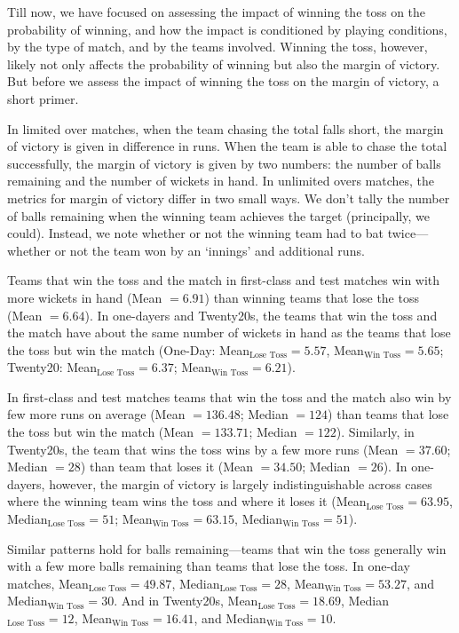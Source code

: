 \documentclass[12pt]{article}
\begin{document}
Till now, we have focused on assessing the impact of winning the toss on the probability of winning, and how the impact is conditioned by playing conditions, by the type of match, and by the teams involved. Winning the toss, however, likely not only affects the probability of winning but also the margin of victory. But before we assess the impact of winning the toss on the margin of victory, a short primer. 

In limited over matches, when the team chasing the total falls short, the margin of victory is given in difference in runs. When the team is able to chase the total successfully, the margin of victory is given by two numbers: the number of balls remaining and the number of wickets in hand. In unlimited overs matches, the metrics for margin of victory differ in two small ways. We don't tally the number of balls remaining when the winning team achieves the target (principally, we could). Instead, we note whether or not the winning team had to bat twice---whether or not the team won by an `innings' and additional runs.

Teams that win the toss and the match in first-class and test matches win with more wickets in hand (Mean $= 6.91$) than winning teams that lose the toss (Mean $= 6.64$). In one-dayers and Twenty20s, the teams that win the toss and the match have about the same number of wickets in hand as the teams that lose the toss but win the match (One-Day: Mean$_{\text{Lose Toss}} = 5.57$, Mean$_{\text{Win Toss}} = 5.65$; Twenty20: Mean$_{\text{Lose Toss}} = 6.37$; Mean$_{\text{Win Toss}} = 6.21$). 

In first-class and test matches teams that win the toss and the match also win by few more runs on average (Mean $= 136.48$; Median $=124$) than teams that lose the toss but win the match (Mean $= 133.71$; Median $=122$). Similarly, in Twenty20s, the team that wins the toss wins by a few more runs (Mean $= 37.60$; Median $=28$) than team that loses it (Mean $= 34.50$; Median $=26$). In one-dayers, however, the margin of victory is largely indistinguishable across cases where the winning team wins the toss and where it loses it (Mean$_{\text{Lose Toss}} = 63.95$, Median$_{\text{Lose Toss}} = 51$; Mean$_{\text{Win Toss}} = 63.15$, Median$_{\text{Win Toss}} = 51$). 

Similar patterns hold for balls remaining---teams that win the toss generally win with a few more balls remaining than teams that lose the toss. In one-day matches, Mean$_{\text{Lose Toss}} = 49.87$, Median$_{\text{Lose Toss}} = 28$, Mean$_{\text{Win Toss}} = 53.27$, and Median$_{\text{Win Toss}} = 30$. And in Twenty20s, Mean$_{\text{Lose Toss}} = 18.69$, Median$_{\text{Lose Toss}} = 12$, Mean$_{\text{Win Toss}} = 16.41$, and Median$_{\text{Win Toss}} = 10$. 
\end{document}
